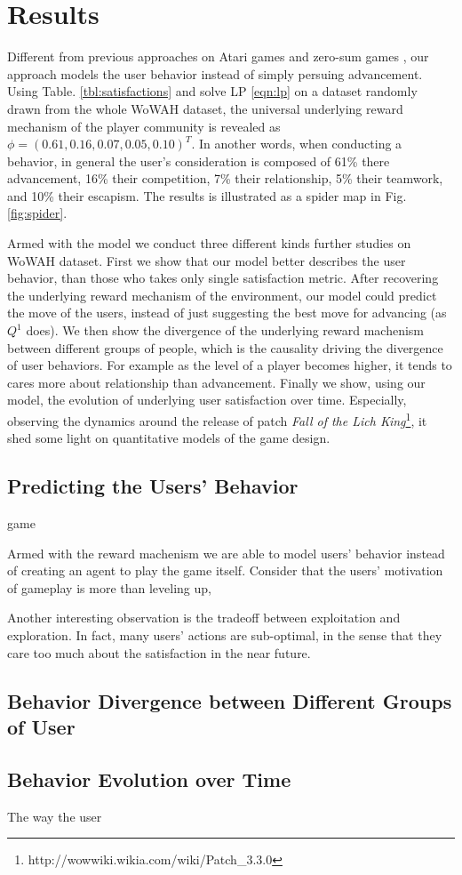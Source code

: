 \documentclass{sigchi}
\begin{document}
\section{Results}

Different from previous approaches on Atari games \cite{mnih2015human} and zero-sum games \cite{silver2016mastering,heinrich2016deep}, our approach models the user behavior instead of simply persuing advancement. Using Table. \ref{tbl:satisfactions} and solve LP \eqref{eqn:lp} on a dataset randomly drawn from the whole WoWAH dataset, the universal underlying reward mechanism of the player community is revealed as $\phi=(0.61, 0.16, 0.07, 0.05, 0.10)^T$. In another words, when conducting a behavior, in general the user's consideration is composed of 61\% there advancement, 16\% their competition, 7\% their relationship, 5\% their teamwork, and 10\% their escapism. The results is illustrated as a spider map in Fig. \ref{fig:spider}.

Armed with the model we conduct three different kinds further studies on WoWAH dataset. First we show that our model better describes the user behavior, than those who takes only single satisfaction metric. After recovering the underlying reward mechanism of the environment, our model could predict the move of the users, instead of just suggesting the best move for advancing (as $Q^1$ does). We then show the divergence of the underlying reward machenism between different groups of people, which is the causality driving the divergence of user behaviors. For example as the level of a player becomes higher, it tends to cares more about relationship than advancement. Finally we show, using our model, the evolution of underlying user satisfaction over time. Especially, observing the dynamics around the release of patch \textit{Fall of the Lich King}\footnote{http://wowwiki.wikia.com/wiki/Patch\_3.3.0}, it shed some light on quantitative models of the game design.

\subsection{Predicting the Users' Behavior}

game



Armed with the reward machenism we are able to model users' behavior instead of creating an agent to play the game itself. Consider that the users' motivation of gameplay is more than leveling up, 

Another interesting observation is the tradeoff between exploitation and exploration. In fact, many users' actions are sub-optimal, in the sense that they care too much about the satisfaction in the near future.

\subsection{Behavior Divergence between Different Groups of User}

\subsection{Behavior Evolution over Time}

The way the user 



\end{document}
